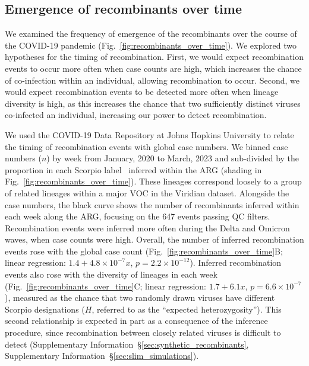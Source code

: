 \documentclass[12pt]{article}
\newcommand{\supref}[1]{Supplementary Information~\S\ref{#1}}
\newcommand{\figref}[1]{Fig.~\ref{#1}}
\begin{document}
\subsection*{Emergence of recombinants over time}

We examined the frequency of emergence of the recombinants
over the course of the COVID-19 pandemic
(\figref{fig:recombinants_over_time}).
We explored two hypotheses for the timing of recombination.
First, we would expect recombination events
to occur more often when case counts are high,
which increases the chance of co-infection within an individual,
allowing recombination to occur.
Second, we would expect recombination events to be detected
more often when lineage diversity is high,
as this increases the chance that
two sufficiently distinct viruses co-infected an individual,
increasing our power to detect recombination.

We used the COVID-19 Data Repository at Johns Hopkins University \cite{Dong2020}
to relate the timing of recombination events with global case numbers. We binned case numbers ($n$) by week from January, 2020 to March, 2023 and
sub-divided by the proportion in each Scorpio label~\cite{Colquhoun2023scorpio}
inferred within the ARG
(shading in \figref{fig:recombinants_over_time}).
These lineages correspond loosely to a group
of related lineages within a major VOC in the Viridian dataset.
Alongside the case numbers,
the black curve shows the number of recombinants
inferred within each week along the ARG,
focusing on the 647 events passing QC filters.
Recombination events were inferred more often
during the Delta and Omicron waves, when case counts were high.
Overall, the number of inferred recombination events rose with the global case count
(\figref{fig:recombinants_over_time}B;
linear regression: $1.4 + 4.8\times 10^{-7} x$, $p = 2.2\times10^{-12}$).
Inferred recombination events also rose with the diversity of lineages in each week
(\figref{fig:recombinants_over_time}C; linear regression:
$1.7 + 6.1 x$, $p = 6.6\times10^{-7}$),
measured as the chance that two randomly drawn viruses have different Scorpio designations
($H$, referred to as the ``expected heterozygosity'').
This second relationship is expected in part as a consequence of the inference
procedure, since recombination between closely related viruses is
difficult to detect (\supref{sec:synthetic_recombinants},
\supref{sec:slim_simulations}).
\end{document}
